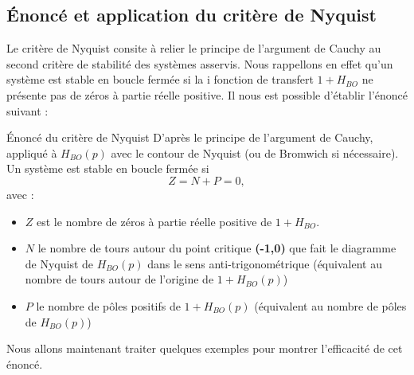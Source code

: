 \subsection{\'Enoncé et application du critère de Nyquist}
Le critère de Nyquist consite à relier le principe de l'argument de Cauchy au 
second critère de stabilité des systèmes asservis\label{critere2}.
Nous rappellons en effet qu'un système est stable en boucle fermée si la i
fonction de transfert $1+H_{BO}$ ne présente pas de zéros à partie réelle 
positive. Il nous est possible d'établir l'énoncé suivant :
\begin{btheorem}{\'Enoncé du critère de Nyquist
    } 
D'après le principe de l'argument de Cauchy, appliqué à $H_{BO}(p)$ avec le 
contour de Nyquist (ou de Bromwich si nécessaire). Un système est stable en 
boucle fermée si 
\[
    Z=N+P=0,
\]
avec :
\begin{itemize}
    \item $Z$ est le nombre de zéros à partie réelle positive de $1+H_{BO}$.  
    \item $N$ le nombre de tours autour du point critique \textbf{(-1,0)} que 
          fait le diagramme de Nyquist de $H_{BO}(p)$ dans le sens 
          anti-trigonométrique
          (équivalent au nombre de tours autour de l'origine de $1+H_{BO}(p)$)
    \item $P$ le nombre de pôles positifs de $1+H_{BO}(p)$ (équivalent au 
          nombre de pôles de $H_{BO}(p)$)
\end{itemize}
\end{btheorem}
Nous allons maintenant traiter quelques exemples pour montrer l'efficacité
de cet énoncé.
